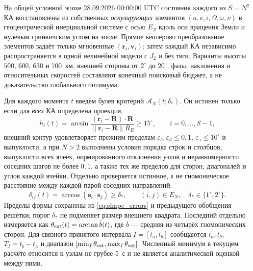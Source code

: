 \documentclass[a4paper,12pt]{article}
\begin{document}
На общей условной эпохе 28.09.2026 00:00:00 UTC
состояния каждого из $S=N^2$ КА восстановлены из собственных
\emph{оскулирующих} элементов $(a,e,i,\Omega,\omega,\nu)$
в геоцентрической инерциальной системе с осью $E_Z$ вдоль оси
вращения Земли и нулевым гринвичским углом на эпохе. Прямое
кеплерово преобразование элементов задаёт только мгновенные
$(\mathbf r_i,\mathbf v_i)$; затем каждый КА независимо
распространяется в одной нелинейной модели с $J_2$ и без тяги.
Варианты высоты $500$, $600$, $630$ и $700$~км, внешней
стороны от $2^\circ$ до $20^\circ$, фазы, наклонения и
относительных скоростей составляют конечный поисковый бюджет,
а не доказательство глобального оптимума.

Для каждого момента $t$ введём булев критерий $\mathcal A_N(t;\delta_*)$.
Он истинен только если для \emph{всех} КА определена проекция,
\begin{equation}
 h_i(t)=\arcsin\frac{(\mathbf r_i-\mathbf R)\cdot\mathbf R}
 {\|\mathbf r_i-\mathbf R\|R_E}\geq15^\circ,\qquad i=0,\ldots,S-1,
\end{equation}
внешний контур удовлетворяет прежним пределам
$\varepsilon_b,\varepsilon_d\leq0{,}1$,
$\varepsilon_\gamma\leq10^\circ$ и выпуклости, а при $N>2$
выполнены условия порядка строк и столбцов, выпуклости всех
ячеек, нормированного отклонения узлов и неравномерности
соседних шагов не более $0{,}1$, а также тех же пределов
для сторон, диагоналей и углов каждой ячейки. Отдельно
проверяется истинное, а не гномоническое расстояние между
каждой парой соседних направлений:
\begin{equation}
 \delta_{ij}(t)=\arccos(\mathbf s_i\cdot\mathbf s_j)
 \geq\delta_*,\qquad (i,j)\in E_N,\quad
 \delta_*\in\{1^\circ,2^\circ\}.
\end{equation}
Пределы формы сохранены из \eqref{eq:shape_errors} и предыдущего
обобщения решётки; порог $\delta_*$ не подменяет размер
внешнего квадрата. Последний отдельно измеряется как
$\theta_{\rm ext}(t)=\arctan\bar b(t)$, где $\bar b$
--- средняя из четырёх гномонических сторон. Для связного
принятого интервала $I=[t_a,t_b]$ сообщаются $t_a,t_b$,
$T_I=t_b-t_a$ и диапазон $[\min_I\theta_{\rm ext},
\max_I\theta_{\rm ext}]$. Численный минимум в текущем
расчёте относится к узлам не грубее $5$~с и не является
аналитической оценкой между ними.
\end{document}
